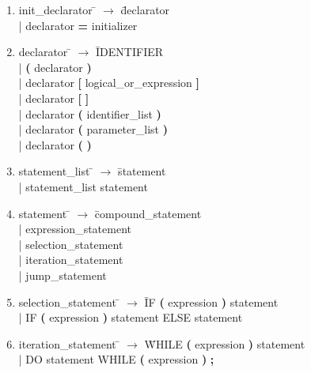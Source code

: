 \documentclass[12pt]{article}
\begin{document}
\begin{enumerate}
\item \begin{tabbing} init{\_}declarator \= $\to$ \= declarator \\
	\> | \> declarator \textbf{=} initializer
\end{tabbing}

\item \begin{tabbing} declarator \= $\to$ \= IDENTIFIER \\
	\> | \> \textbf{(} declarator \textbf{)} \\
	\> | \> declarator \textbf{[} logical{\_}or{\_}expression \textbf{]} \\
	\> | \> declarator \textbf{[} \textbf{]} \\
	\> | \> declarator \textbf{(} identifier{\_}list \textbf{)} \\
	\> | \> declarator \textbf{(} parameter{\_}list \textbf{)} \\
	\> | \> declarator \textbf{(} \textbf{)}
\end{tabbing}

\item \begin{tabbing} statement{\_}list \= $\to$ \= statement \\
	\> | \> statement{\_}list statement
\end{tabbing}

\item \begin{tabbing} statement \= $\to$ \= compound{\_}statement \\
	\> | \> expression{\_}statement \\
	\> | \> selection{\_}statement \\
	\> | \> iteration{\_}statement \\
	\> | \> jump{\_}statement
\end{tabbing}

\item \begin{tabbing} selection{\_}statement \= $\to$ \= IF \textbf{(} expression \textbf{)} statement \\
	\> | \> IF \textbf{(} expression \textbf{)} statement ELSE statement
\end{tabbing}

\item \begin{tabbing} iteration{\_}statement \= $\to$ \= WHILE \textbf{(} expression \textbf{)} statement \\
	\> | \> DO statement WHILE \textbf{(} expression \textbf{)} \textbf{;}
\end{tabbing}


\end{enumerate}
\end{document}
